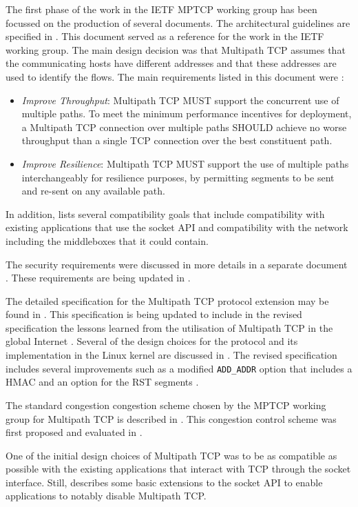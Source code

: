 
The first phase of the work in the IETF MPTCP working group has been focussed on the production of several documents. The architectural guidelines are specified in \cite{rfc6182}. This document served as a reference for the work in the IETF working group. The main design decision was that Multipath TCP assumes that the communicating hosts have different addresses and that these addresses are used to identify the flows. The main requirements listed in this document were :
\begin{itemize}

\item \emph{Improve Throughput}: Multipath TCP MUST support the concurrent use of multiple paths.  To meet the minimum performance incentives for deployment, a Multipath TCP connection over multiple paths SHOULD achieve no worse throughput than a single TCP connection over the best constituent path.
\item \emph{Improve Resilience}: Multipath TCP MUST support the use of multiple paths interchangeably for resilience purposes, by permitting segments to be sent and re-sent on any available path. 
\end{itemize}

In addition, \cite{rfc6182} lists several compatibility goals that include compatibility with existing applications that use the socket API and compatibility with the network including the middleboxes that it could contain.

The security requirements were discussed in more details in a separate document \cite{rfc6181}. These requirements are being updated in \cite{draft-ietf-mptcp-attacks}.



The detailed specification for the Multipath TCP protocol extension may be found in \cite{rfc6824}. This specification is being updated to include in the revised specification the lessons learned from the utilisation of Multipath TCP in the global Internet \cite{draft-ietf-mptcp-experience}. Several of the design choices for the protocol and its implementation in the Linux kernel are discussed in \cite{Raiciu_Hard:2012}. The revised specification \cite{draft-ietf-mptcp-rfc6824bis} includes several improvements such as a modified \texttt{ADD\_ADDR} option that includes a HMAC and an option for the RST segments \cite{draft-bonaventure-mptcp-rst}.

The standard congestion congestion scheme chosen by the MPTCP working group for Multipath TCP is described in \cite{rfc6356}. This congestion control scheme was first proposed and evaluated in \cite{Wischik_Design:2011}.

One of the initial design choices of Multipath TCP was to be as compatible as possible with the existing applications that interact with TCP through the socket interface. Still, \cite{rfc6897} describes some basic extensions to the socket API to enable applications to notably disable Multipath TCP.  

